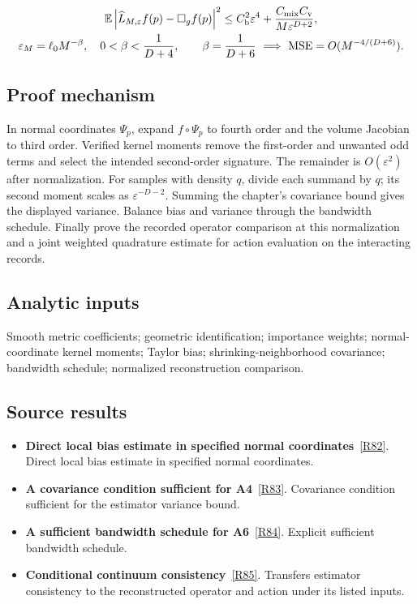 \documentclass[11pt,a4paper]{article}
\begin{document}
\begin{gather*}
\mathbb E\left|\widehat L_{M,\varepsilon}f(p)-\Box_gf(p)\right|^2
\le C_{\rm b}^2\varepsilon^4+
\frac{C_{\rm mix}C_{\rm v}}{M\varepsilon^{D+2}},\\
\varepsilon_M=\ell_0M^{-\beta},\quad 0<\beta<\frac1{D+4},\qquad
\beta=\frac1{D+6}\ \Longrightarrow\ \mathrm{MSE}=O(M^{-4/(D+6)}).
\end{gather*}
\subsection*{Proof mechanism}
In normal coordinates \(\Psi_p\), expand \(f\circ\Psi_p\) to fourth order and the volume Jacobian to third order. Verified kernel moments remove the first-order and unwanted odd terms and select the intended second-order signature. The remainder is \(O(\varepsilon^2)\) after normalization. For samples with density \(q\), divide each summand by \(q\); its second moment scales as \(\varepsilon^{-D-2}\). Summing the chapter's covariance bound gives the displayed variance. Balance bias and variance through the bandwidth schedule. Finally prove the recorded operator comparison at this normalization and a joint weighted quadrature estimate for action evaluation on the interacting records.
\subsection*{Analytic inputs}
Smooth metric coefficients; geometric identification; importance weights; normal-coordinate kernel moments; Taylor bias; shrinking-neighborhood covariance; bandwidth schedule; normalized reconstruction comparison.
\subsection*{Source results}
\begin{itemize}
\item \textbf{Direct local bias estimate in specified normal coordinates}~\hyperref[src:lem-continuum-local-bias]{[R82]}. Direct local bias estimate in specified normal coordinates.
\item \textbf{A covariance condition sufficient for A4}~\hyperref[src:lem-continuum-a4-mixing]{[R83]}. Covariance condition sufficient for the estimator variance bound.
\item \textbf{A sufficient bandwidth schedule for A6}~\hyperref[src:lem-continuum-a6-scaling]{[R84]}. Explicit sufficient bandwidth schedule.
\item \textbf{Conditional continuum consistency}~\hyperref[src:cor-continuum-consistency-conditional]{[R85]}. Transfers estimator consistency to the reconstructed operator and action under its listed inputs.
\end{itemize}
\end{document}
